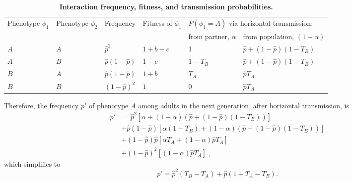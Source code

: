 \documentclass[12pt]{extarticle}
\begin{document}
\bigskip
\begin{table}[]
\caption{\textbf{Interaction frequency, fitness, and transmission probabilities.}}
\begin{tabular}{@{}llllll@{}}
\toprule
\multirow{2}{*}{Phenotype $\phi_1$} &
  \multirow{2}{*}{Phenotype $\phi_2$} &
  \multirow{2}{*}{Frequency} &
  \multirow{2}{*}{Fitness of $\phi_1$} &
  \multicolumn{2}{l}{$P(\phi_1=A)$ via horizontal transmission:} \\ \cmidrule(l){5-6} 
    &     &                      &         & from partner, $\alpha$ & from population, $(1-\alpha)$ \\ \cmidrule(r){1-6}
$A$ & $A$ & $\hat{p}^2$          & $1+b-c$ & 1                      & $\hat{p}+(1-\hat{p})(1-T_B)$  \\
$A$ & $B$ & $\hat{p}(1-\hat{p})$ & $1-c$   & $1-T_B$                & $\hat{p}+(1-\hat{p})(1-T_B)$  \\
$B$ & $A$ & $\hat{p}(1-\hat{p})$ & $1+b$   & $T_A$                  & $\hat{p} T_A$                 \\
$B$ & $B$ & $(1-\hat{p})^2$      & $1$     & $0$                    & $\hat{p} T_A$                 \\ \bottomrule
\end{tabular}
\label{table:interactions}
\end{table}
\bigskip


Therefore, the frequency $p'$ of phenotype $A$ among adults in the next generation, after horizontal transmission, is 
\begin{equation}\label{eq:nextgen_adults}
\begin{aligned}
p'
& = \hat{p}^2 [\alpha + (1-\alpha)(\hat{p} + (1-\hat{p})(1-T_B))] \\
& + \hat{p}(1-\hat{p}) [\alpha(1-T_B) + (1-\alpha)(\hat{p} + (1-\hat{p})(1-T_B))] \\
& + (1-\hat{p})\hat{p} [\alpha T_A + (1-\alpha) \hat{p} T_A ] \\
& + (1-\hat{p})^2 [(1-\alpha) \hat{p} T_A] \;,
\end{aligned}
\end{equation}
which simplifies to
\begin{equation}\label{eq:nextgen_adults_slimpify}
p' = \hat{p}^2(T_B-T_A) + \hat{p}(1+T_A-T_B) .
\end{equation}
\end{document}
